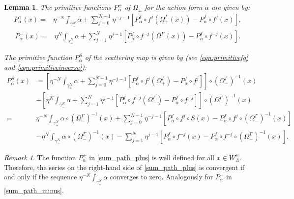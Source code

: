 \documentclass[11pt]{amsart}
\newtheorem{lem}[thm]{Lemma}
\theoremstyle{definition}
\theoremstyle{remark}
\newtheorem{rem}[thm]{Remark}
\numberwithin{equation}{section}
\begin{document}
\begin{lem}\label{lem:sum_path_plus_minus}
  The primitive functions $P^\pm_\alpha$ of $\Omega_\pm$  for the action   form $\alpha$ are given by:
\begin{equation}
  \label{sum_path_plus}
\begin{split}
P^+_\alpha(x)=&\eta^{-N} \int_{\gamma^N_+}\alpha +\sum_{j=0}^{N-1}\eta^{-j-1}[P^f_\alpha\circ f^j(\Omega_+^\Gamma(x))-P^f_\alpha\circ f^j(x)],
 \end{split}
\end{equation}
\begin{equation}\label{sum_path_minus}
\begin{split}
P^-_\alpha(x)=&\eta^{N} \int_{\gamma^N_-}\alpha +\sum_{j=1}^{N}\eta^{j-1}[P^f_\alpha\circ f^{-j}(\Omega_-^\Gamma(x))-P^f_\alpha\circ f^{-j}(x)].
 \end{split}
\end{equation}



The primitive function $P^S_\alpha$ of the scattering map is given by (see \eqref{eqn:primitivefg} and \eqref{eqn:primitiveinverse}):
\begin{equation}
  \label{sum_path_plus_minus}
\begin{split}
P^S_\alpha(x)&=\left[\eta^{-N} \int_{\gamma^N_+}\alpha +\sum_{j=0}^{N-1}\eta^{-j-1}[P_\alpha^f\circ f^j(\Omega^\Gamma_+)-P_\alpha^f\circ f^j]\right]\circ (\Omega^\Gamma_-)^{-1}(x)\\
&-\left[\eta^{N} \int_{\gamma^N_-}\alpha +\sum_{j=1}^{N}\eta^{j-1}[P_\alpha^f\circ f^{-j}(\Omega^\Gamma_-)-P_\alpha^f\circ f^{-j}]\right ]\circ (\Omega^\Gamma_-)^{-1}(x)\\
=&\eta^{-N} \int_{\gamma^N_+}\alpha\circ (\Omega^\Gamma_-)^{-1}(x) +\sum_{j=0}^{N-1}\eta^{-j-1}[P_\alpha^f\circ f^j\circ S(x) -P_\alpha^f\circ f^j\circ (\Omega^\Gamma_-)^{-1}(x)] \\
&- \eta^{N} \int_{\gamma^N_-}\alpha \circ(\Omega^\Gamma_-)^{-1}(x) -\sum_{j=1}^{N}\eta^{j-1}[P_\alpha^f\circ f^{-j}(x)-P_\alpha^f\circ f^{-j}\circ(\Omega^\Gamma_-)^{-1}(x) ] .
 \end{split}
\end{equation}
\end{lem}



\begin{rem} \label{rem:converegence_equivalent}
The function  $P^+_\alpha$ in \eqref{sum_path_plus} is well defined for all $x\in W^s_\Lambda$. Therefore, the series on the right-hand side of \eqref{sum_path_plus} is convergent if and only if  the sequence $\eta^{-N}\int_{\gamma^N_+}\alpha$
  converges to zero. Analogously for  $P^-_\alpha$ in \eqref{sum_path_minus}.
\end{rem}
\end{document}
